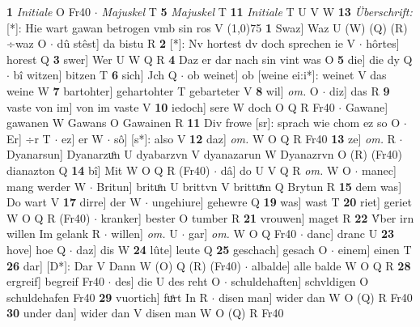 \documentclass[8pt,a4paper,notitlepage]{article}
\begin{document}
\begin{table}[ht]
\begin{minipage}[t]{0.5\linewidth}
\textbf{1} \textit{Initiale} O Fr40   $\cdot$ \textit{Majuskel} T  \textbf{5} \textit{Majuskel} T  \textbf{11} \textit{Initiale} T U V W  \textbf{13} \textit{Überschrift:} [*]: Hie wart gawan betrogen vmb sin ros V  \newline
\line(1,0){75} \newline
\textbf{1} Swaz] Waz U (W) (Q) (R) ÷waz O  $\cdot$ dû stêst] da bistu R \textbf{2} [*]: Nv hortest dv doch sprechen ie V  $\cdot$ hôrtes] horest Q \textbf{3} swer] Wer U W Q R \textbf{4} Daz er dar nach sin vint was O \textbf{5} die] die dy Q  $\cdot$ bî witzen] bitzen T \textbf{6} sich] Jch Q  $\cdot$ ob weinet] ob [weine ei:i*]: weinet V das weine W \textbf{7} bartohter] gehartohter T gebarteter V \textbf{8} wil] \textit{om.} O  $\cdot$ diz] das R \textbf{9} vaste von im] von im vaste V \textbf{10} iedoch] sere W doch O Q R Fr40  $\cdot$ Gawane] gawanen W Gawans O Gawainen R \textbf{11} Div frowe [sr]: sprach wie chom ez so O  $\cdot$ Er] ÷r T  $\cdot$ ez] er W  $\cdot$ sô] [s*]: also V \textbf{12} daz] \textit{om.} W O Q R Fr40 \textbf{13} ze] \textit{om.} R  $\cdot$ Dyanarsun] Dyanarzuͦn U dyabarzvn V dyanazarun W Dyanazrvn O (R) (Fr40) dianazton Q \textbf{14} bî] Mit W O Q R (Fr40)  $\cdot$ dâ] do U V Q R \textit{om.} W O  $\cdot$ manec] mang werder W  $\cdot$ Britun] brituͦn U brittvn V brittuͯm Q Brytun R \textbf{15} dem was] Do wart V \textbf{17} dirre] der W  $\cdot$ ungehiure] gehewre Q \textbf{19} was] wast T \textbf{20} riet] geriet W O Q R (Fr40)  $\cdot$ kranker] bester O tumber R \textbf{21} vrouwen] maget R \textbf{22} V́ber irn willen Im gelank R  $\cdot$ willen] \textit{om.} U  $\cdot$ gar] \textit{om.} W O Q Fr40  $\cdot$ danc] dranc U \textbf{23} hove] hoe Q  $\cdot$ daz] dis W \textbf{24} lûte] leute Q \textbf{25} geschach] gesach O  $\cdot$ einem] einen T \textbf{26} dar] [D*]: Dar V Dann W (O) Q (R) (Fr40)  $\cdot$ albalde] alle balde W O Q R \textbf{28} ergreif] begreif Fr40  $\cdot$ des] die U des reht O  $\cdot$ schuldehaften] schvldigen O schuldehafen Fr40 \textbf{29} vuortich] fuͦrt In R  $\cdot$ disen man] wider dan W O (Q) R Fr40 \textbf{30} under dan] wider dan V disen man W O (Q) R Fr40 \newline
\end{minipage}
\end{table}
\end{document}
